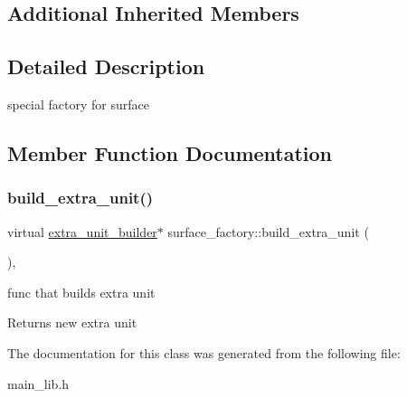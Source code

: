 \subsection*{Additional Inherited Members}


\subsection{Detailed Description}
special factory for surface 

\subsection{Member Function Documentation}
\mbox{\label{classsurface__factory_a7a75bc9c3cd6b38bfbdcd062498beffc}} 
\subsubsection{\texorpdfstring{build\+\_\+extra\+\_\+unit()}{build\_extra\_unit()}}
{\footnotesize\ttfamily virtual \mbox{\hyperlink{classextra__unit__builder}{extra\+\_\+unit\+\_\+builder}}$\ast$ surface\+\_\+factory\+::build\+\_\+extra\+\_\+unit (\begin{DoxyParamCaption}{ }\end{DoxyParamCaption})\hspace{0.3cm}{\ttfamily [inline]}, {\ttfamily [virtual]}}

func that builds extra unit \begin{DoxyReturn}{Returns}
new extra unit 
\end{DoxyReturn}


The documentation for this class was generated from the following file\+:\begin{DoxyCompactItemize}
\item 
main\+\_\+lib.\+h\end{DoxyCompactItemize}
